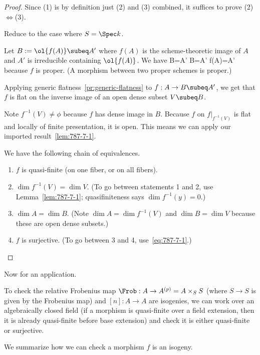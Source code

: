 \begin{proof}
Since (1) is by definition just (2) and (3) combined, it suffices to prove (2)$\iff$(3).

Reduce to the case where $S=\Spec k$. %

Let $B:=\ol{f(A)}\subeq A'$ where $f(A)$ is the scheme-theoretic image of $A$ and $A'$ is irreducible containing $\ol{f(A)}$. We have
\dim B=\dim A' \iff B=A' \iff f(A)=A'
\eeq
because $f$ is proper. (A morphism between two proper schemes is proper.) %

Applying generic flatness~\ref{pr:generic-flatness} to $f:A\to B\subeq A'$, we get that $f$ is flat on the inverse image of an open dense subset $V\subeq B$. %

Note $f^{-1}(V)\ne \phi$ because $f$ has dense image in $B$. 
Because $f$ on $f|_{f^{-1}(V)}$ is flat and locally of finite presentation, it is open.   This means we can apply our imported result~\ref{lem:787-7-1}.

We have the following chain of equivalences.
\begin{enumerate}
\item $f$ is quasi-finite (on one fiber, or on all fibers).
\item $\dim f^{-1}(V)=\dim V$. (To go between statements 1 and 2, use Lemma~\ref{lem:787-7-1}; quasifiniteness says $\dim f^{-1}(y)=0$.)
\item $\dim A=\dim B$. (Note $\dim A=\dim f^{-1}(V)$ and $\dim B=\dim V$ because these are open dense subsets.)
\item $f$ is surjective. (To go between 3 and 4, use~\eqref{eq:787-7-1}.)
\end{enumerate}
\end{proof}
Now for an application.
\begin{ex}
To check the relative Frobenius map $\Frob: A\to A^{(p)}=A\times_S S$ (where $S\to S$ is given by the Frobenius map) and $[n]:A\to A$ are isogenies, we can work over an algebraically closed field
(if a morphism is quasi-finite over a field extension, then it is already quasi-finite before base extension) and check it is either quasi-finite or surjective. %
\end{ex}
We summarize how we can check a morphism $f$ is an isogeny.\\

